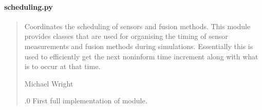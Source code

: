 \documentclass[letterpaper,10pt,english]{sphinxmanual}
\begin{document}
\paragraph{scheduling.py}
\label{\detokenize{modules/simulation/scheduling:scheduling-py}}\begin{quote}\begin{description}
\sphinxAtStartPar
Coordinates the scheduling of sensors and fusion methods.
This module provides classes that are used for organising the timing of
sensor measurements and fusion methods during simulations. Essentially
this is used to efficiently get the next non\sphinxhyphen{}inform time increment
along with what is to occur at that time.

\sphinxAtStartPar
Michael Wright \sphinxhyphen{} 

.0 \sphinxhyphen{} First full implementation of module.

\end{description}\end{quote}
\end{document}

